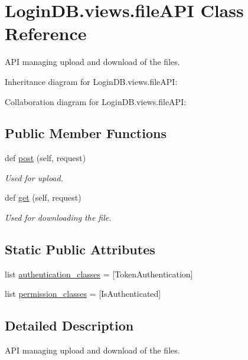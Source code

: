 \hypertarget{class_login_d_b_1_1views_1_1file_a_p_i}{}\section{Login\+D\+B.\+views.\+file\+A\+PI Class Reference}
\label{class_login_d_b_1_1views_1_1file_a_p_i}


A\+PI managing upload and download of the files.  




Inheritance diagram for Login\+D\+B.\+views.\+file\+A\+PI\+:


Collaboration diagram for Login\+D\+B.\+views.\+file\+A\+PI\+:
\subsection*{Public Member Functions}
\begin{DoxyCompactItemize}
\item 
def \hyperlink{class_login_d_b_1_1views_1_1file_a_p_i_a6e88d18d20b5d327a78a94fcda9c4efa}{post} (self, request)
\begin{DoxyCompactList}\small\item\em Used for upload. \end{DoxyCompactList}\item 
def \hyperlink{class_login_d_b_1_1views_1_1file_a_p_i_a103df06e20d613c155c8f4ad0cb59b7c}{get} (self, request)
\begin{DoxyCompactList}\small\item\em Used for downloading the file. \end{DoxyCompactList}\end{DoxyCompactItemize}
\subsection*{Static Public Attributes}
\begin{DoxyCompactItemize}
\item 
list \hyperlink{class_login_d_b_1_1views_1_1file_a_p_i_a5883c87de1e62d011e0d3868c74a5dce}{authentication\+\_\+classes} = \mbox{[}Token\+Authentication\mbox{]}
\item 
list \hyperlink{class_login_d_b_1_1views_1_1file_a_p_i_a624b994a7019e545df5c9a4d10d256bd}{permission\+\_\+classes} = \mbox{[}Is\+Authenticated\mbox{]}
\end{DoxyCompactItemize}


\subsection{Detailed Description}
A\+PI managing upload and download of the files. 


